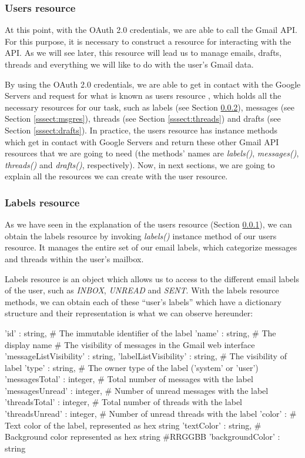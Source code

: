 \subsubsection{Users resource}\label{sssect:usersres}
At this point, with the OAuth 2.0 credentials, we are able to call the Gmail API. For this purpose, it is necessary to construct a resource \citep[/v1/reference]{gmailAPI} for interacting with the API. As we will see later, this resource will lead us to manage emails, drafts, threads and everything we will like to do with the user's Gmail data.

By using the OAuth 2.0 credentials, we are able to get in contact with the Google Servers and request for what is known as users resource \citep[/v1/reference/users]{gmailAPI}, which holds all the necessary resources for our task, such as labels (see Section \ref{sssect:labres}), messages (see Section \ref{sssect:msgres}), threads (see Section \ref{sssect:threads}) and drafts (see Section \ref{sssect:drafts}). In practice, the users resource has instance methods which get in contact with Google Servers and return these other Gmail API resources that we are going to need (the methods' names are \textit{labels()}, \textit{messages()}, \textit{threads()} and \textit{drafts()}, respectively). Now, in next sections, we are going to explain all the resources we can create with the user resource.

\subsubsection{Labels resource}\label{sssect:labres}
As we have seen in the explanation of the users resource (Section \ref{sssect:usersres}), we can obtain the labels resource \citep[/v1/reference/users/labels]{gmailAPI} by invoking \textit{labels()} instance method of our users resource. It manages the entire set of our email labels, which  categorize messages and threads within the user's mailbox.

Labels resource is an object which allows us to access to the different email labels of the user, such as \textit{INBOX}, \textit{UNREAD} and \textit{SENT}. With the labels resource methods, we can obtain each of these ``user's labels'' which have a dictionary structure and their representation is what we can observe hereunder:

\begin{python}
	{
		'id' : string, # The immutable identifier of the label
		'name' : string, # The display name
		# The visibility of messages in the Gmail web interface
		'messageListVisibility' : string,
		'labelListVisibility' : string, # The visibility of label
		'type' : string, # The owner type of the label ('system' or 'user')
		'messagesTotal' : integer, # Total number of messages with the label
		'messagesUnread' : integer, # Number of unread messages with the label
		'threadsTotal' : integer, # Total number of threads with the label
		'threadsUnread' : integer, # Number of unread threads with the label
		'color' : {
			# Text color of the label, represented as hex string
			'textColor' : string,
			# Background color represented as hex string #RRGGBB
			'backgroundColor' : string 
		}
	}
\end{python}

